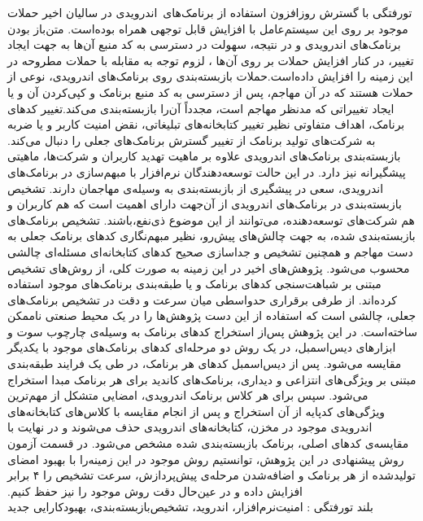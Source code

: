 


‌تورفتگی
‫با گسترش روزافزون استفاده از برنامک‌های\ اندرویدی  در سالیان اخیر حملات موجود بر روی این سیستم‌عامل با افزایش قابل توجهی همراه بوده‌است. متن‌باز بودن برنامک‌های اندرویدی و در نتیجه، سهولت در دسترسی به کد منبع آن‌ها به جهت ایجاد تغییر، در کنار افزایش حملات بر روی آن‌ها ، لزوم توجه به مقابله با حملات مطروحه در این زمینه‌ را افزایش داده‌است.حملات بازبسته‌بندی روی برنامک‌های اندرویدی، نوعی از حملات هستند که در آن مهاجم، پس از دسترسی به کد منبع برنامک و کپی‌کردن آن و یا ایجاد تغییراتی که مدنظر مهاجم است، مجدداً آن‌را بازبسته‌بندی می‌کند.تغییر کد‌های برنامک، اهداف متفاوتی نظیر تغییر کتابخانه‌های تبلیغاتی، نقض امنیت کاربر و یا ضربه به شرکت‌های تولید برنامک‌ از تغییر گسترش برنامک‌های جعلی را دنبال می‌کند. بازبسته‌بندی برنامک‌های اندرویدی علاوه بر ماهیت تهدید کاربران و شرکت‌ها، ماهیتی پیشگیرانه نیز دارد. در این حالت توسعه‌دهندگان نرم‌افزار با مبهم‌سازی در برنامک‌های اندرویدی، سعی در پیشگیری از بازبسته‌بندی به وسیله‌ی مهاجمان دارند. تشخیص بازبسته‌بندی در برنامک‌های اندرویدی از آن‌جهت دارا‌ی اهمیت است که هم کاربران و هم شرکت‌های توسعه‌دهنده، می‌توانند از این موضوع ذی‌نفع،باشند. تشخیص‌ برنامک‌های بازبسته‌بندی شده، به جهت چالش‌های پیش‌رو، نظیر مبهم‌نگاری کد‌های برنامک‌‌ جعلی به دست مهاجم و همچنین تشخیص و جداسازی صحیح کد‌های کتابخانه‌ای مسئله‌ای چالشی محسوب می‌شود. پژوهش‌های اخیر در این زمینه به صورت کلی، از روش‌‌های تشخیص مبتنی بر شباهت‌سنجی کد‌های برنامک و یا طبقه‌بندی برنامک‌های موجود استفاده‌ کرده‌اند. از طرفی برقراری حد‌واسطی میان سرعت‌ و دقت در تشخیص برنامک‌های جعلی، چالشی است که استفاده از این دست پژوهش‌ها را در یک محیط صنعتی ناممکن ساخته‌است. در این پژوهش پس‌از استخراج کد‌های برنامک به وسیله‌ی چارچوب سوت و ابزار‌های دیس‌اسمبل، در یک روش دو مرحله‌ای کد‌های برنامک‌های موجود با یکدیگر مقایسه می‌شود. پس از دیس‌اسمبل کد‌های هر برنامک، در طی یک فرایند طبقه‌بندی مبتنی بر ویژگی‌های انتزاعی و دیداری، برنامک‌های کاندید برای هر برنامک مبدا استخراج می‌شود. سپس برای هر کلاس برنامک‌ اندرویدی، امضایی متشکل از مهم‌ترین ویژگی‌های کد‌پایه از آن استخراج و پس از انجام مقایسه‌ با کلاس‌های کتابخانه‌های اندرویدی موجود در مخزن، کتابخانه‌های اندرویدی حذف می‌شوند و در نهایت با مقایسه‌ی کد‌های اصلی، برنامک‌ بازبسته‌بندی‌ شده مشخص می‌شود.
در قسمت آزمون روش پیشنهادی در این پژوهش، توانستیم روش موجود در این زمینه‌را با بهبود امضا‌ی تولید‌شده از هر برنامک و اضافه‌شدن مرحله‌ی پیش‌پردازش، سرعت تشخیص را ۴ برابر افزایش داده و در عین‌حال دقت روش موجود را نیز حفظ‌ کنیم.  
 \\
‌بلند
‌تورفتگی : 
امنیت‌نرم‌افزار، اندروید، تشخیص‌باز‌بسته‌بندی، بهبود‌کارایی
‌جدید